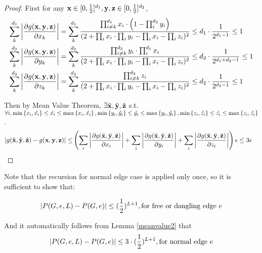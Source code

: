 	\begin{proof}
		First for any ${\bf x} \in [0, \frac{1}{2}]^{d_1} , {\bf y,z} \in [0, \frac{1}{2}]^{d_2}$,
		\begin{align*}
		\sum_k^{d_1} \left\vert \frac{\partial g({\bf x,y,z})}{\partial x_k} \right\vert &= \sum_k^{d_1} \frac{\prod_{i\neq k}^{d_1} x_i \cdot \left( 1 - \prod_i^{d_2} y_i \right)}{(2+\prod_i x_i \cdot \prod_i y_i - \prod_i x_i - \prod_i z_i)^2}
		\leq d_1\cdot  \frac{1}{2^{d_1 - 1}}  \leq 1 \\
		\sum_k^{d_2} \left\vert \frac{\partial g({\bf x,y,z})}{\partial y_k} \right\vert &= \sum_k^{d_2} \frac{\prod_{i\neq k}^{d_2} y_i \cdot \prod_{i}^{d_1} x_i}{(2+\prod_i x_i \cdot \prod_i y_i - \prod_i x_i - \prod_i z_i)^2}
		\leq d_2 \cdot \frac{1}{2^{d_1 + d_2 - 1}} \leq 1 \\
		\sum_k^{d_2} \left\vert \frac{\partial g({\bf x,y,z})}{\partial z_k} \right\vert &= \sum_k^{d_2} \frac{\prod_{i\neq k}^{d_2} z_i }{(2+\prod_i x_i \cdot \prod_i y_i - \prod_i x_i - \prod_i z_i)^2}
		\leq d_2 \cdot \frac{1}{2^{d_2 - 1}} \leq 1
		\end{align*}

		Then by Mean Value Theorem, $\exists \tilde{\bf x}, \tilde{\bf y},  \tilde{\bf z}$ s.t. $\forall i, \min\left\{x_i,\hat{x_i}\right\} \leq \tilde{x_i} \leq \max\left\{x_i, \hat{x_i}\right\}, \min\left\{y_i,\hat{y_i}\right\} \leq \tilde{y_i} \leq \max\left\{y_i, \hat{y_i}\right\}, \min\left\{z_i,\hat{z_i}\right\} \leq \tilde{z_i} \leq \max\left\{z_i, \hat{z_i}\right\}$.
		\begin{align*}
		\left\vert g(\hat{\bf x}, \hat{\bf y}, \hat{\bf z}) - g({\bf x,y,z})\right\vert \leq &
		\left(  \sum_i\left\vert \frac{\partial g(\tilde{\bf x},\tilde{\bf y},\tilde{\bf z} )}{\partial x_i}\right\vert + \sum_i\left\vert \frac{\partial g(\tilde{\bf x},\tilde{\bf y},\tilde{\bf z} )}{\partial y_i}\right\vert +  \sum_i\left\vert \frac{\partial g(\tilde{\bf x},\tilde{\bf y},\tilde{\bf z} )}{\partial z_i}\right\vert \right)  \epsilon
		\leq  3\epsilon
		\end{align*}
	\end{proof}


		Note that the recursion for normal edge case is applied only once, so it is sufficient to show that:

		\[\left\vert P(G,e,L) - P(G,e)\right\vert \leq (\frac{1}{2})^{L+1}, \textrm{for free or dangling edge $e$}\]
		
		And it automatically follows from Lemma \ref{meanvalue2} that
		\[\left\vert P(G,e,L) - P(G,e)\right\vert \leq 3\cdot(\frac{1}{2})^{L+1}, \textrm{for normal edge $e$}\]


